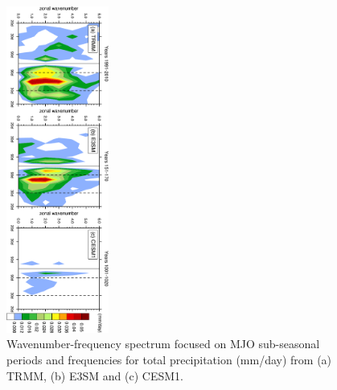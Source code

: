 \documentclass[draft,ms]{AGUTeX}
\begin{document}
\begin{article}
\begin{figure}[t]
  \begin{center}
    \noindent\includegraphics[width=0.3\textwidth,angle=90.]{./figs/f_mjo_spectra_PRECT_djf.pdf}
  \end{center}
  \caption{Wavenumber-frequency spectrum focused on MJO sub-seasonal periods and frequencies for total precipitation (mm/day) from (a) TRMM, (b) E3SM and (c) CESM1.} 
\label{f_mjo_spectra_PRECT_djf}
\end{figure}


\end{article}
\end{document}
